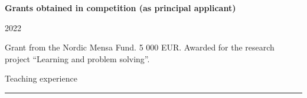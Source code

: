 \documentclass[10pt]{article}
\newcommand{\RR}{\textcolor{grayrule}{\rule[3mm]{\textwidth}{0.5pt}}}
\begin{document}
\textbf{Grants obtained in competition (as principal applicant)}

\vspace{-0.6em}
\begin{minipage}[t]{0.075\linewidth}
2022 
\end{minipage} 
\begin{minipage}[t]{0.92\linewidth}Grant from the Nordic Mensa Fund. 5 000 EUR. Awarded for the research project \enquote{Learning and problem solving}. \vspace{\baselineskip}
\end{minipage}


 
%

{\large Teaching experience} \\
\vspace{-.3cm}\RR 
\end{document}
